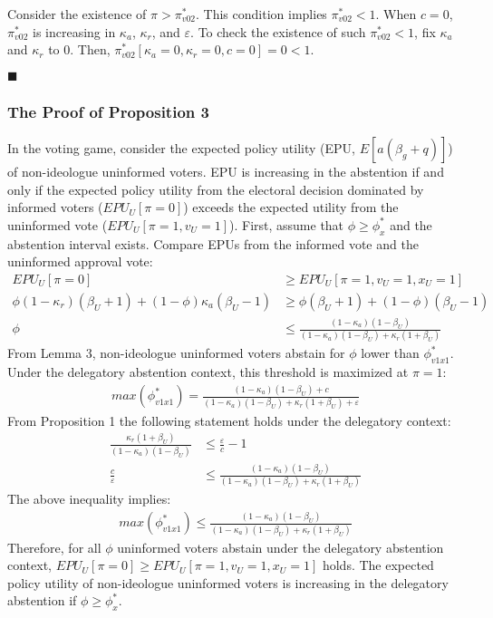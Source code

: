 \par Consider the existence of $\pi > \pi^*_{v02}$. This condition implies $\pi^*_{v02} <1$. When $c=0$, $\pi^*_{v02}$ is increasing in $\kappa_a$, $\kappa_r$, and $\varepsilon$. To check the existence of such $\pi^*_{v02} <1$, fix $\kappa_a$ and $\kappa_r$ to $0$. Then, $\pi^*_{v02}[\kappa_a=0,\kappa_r=0,c=0] = 0 < 1$.

\hfill $\blacksquare$ 

\subsubsection{The Proof of Proposition 3}

\par In the voting game, consider the expected policy utility (EPU, $E[a(\beta_g + q)]$) of non-ideologue uninformed voters. EPU is increasing in the abstention if and only if the expected policy utility from the electoral decision dominated by informed voters ($EPU_U[\pi=0]$) exceeds the expected utility from the uninformed vote ($EPU_U[\pi=1,v_U=1]$). First, assume that $\phi \geq \phi^*_x$ and the abstention interval exists. Compare EPUs from the informed vote and the uninformed approval vote:  
\begin{align*}
EPU_U[\pi=0] &\geq EPU_U[\pi=1,v_U=1,x_U=1] \\
\phi(1-\kappa_r)(\beta_U+1) + (1-\phi)\kappa_a(\beta_U-1) &\geq \phi(\beta_U+1) + (1-\phi)(\beta_U-1) \\
\phi &\leq \frac{(1-\kappa_a)(1-\beta_U)}{(1-\kappa_a)(1-\beta_U)+\kappa_r(1+\beta_U)}
\end{align*}
\noindent From Lemma 3, non-ideologue uninformed voters abstain for $\phi$ lower than $\phi^*_{v1x1}$. Under the delegatory abstention context, this threshold is maximized at $\pi=1$: 
\begin{align*}
max(\phi^*_{v1x1}) = \frac{(1-\kappa_a)(1-\beta_U) + c}{(1-\kappa_a)(1-\beta_U)+\kappa_r(1+\beta_U) + \varepsilon}
\end{align*}
From Proposition 1 the following statement holds under the delegatory context:
\begin{align*}
\frac{\kappa_r(1+\beta_U)}{(1-\kappa_a)(1-\beta_U)} &\leq \frac{\varepsilon}{c} - 1\\
\frac{c}{\varepsilon} &\leq \frac{(1-\kappa_a)(1-\beta_U)}{(1-\kappa_a)(1-\beta_U)+\kappa_r(1+\beta_U)}
\end{align*}
The above inequality implies:  
\begin{align*}
max(\phi^*_{v1x1}) \leq \frac{(1-\kappa_a)(1-\beta_U)}{(1-\kappa_a)(1-\beta_U)+\kappa_r(1+\beta_U)}
\end{align*}
\noindent Therefore, for all $\phi$ uninformed voters abstain under the delegatory abstention context, $EPU_U[\pi=0] \geq EPU_U[\pi=1,v_U=1,x_U=1]$ holds. The expected policy utility of non-ideologue uninformed voters is increasing in the delegatory abstention if $\phi \geq \phi^*_x$. 

